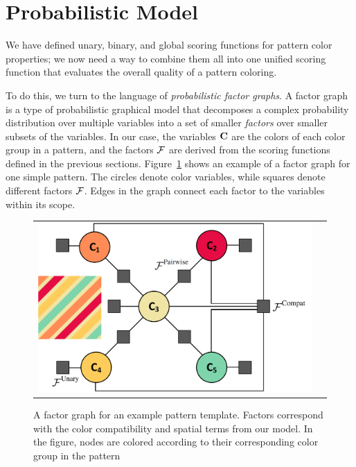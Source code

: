 \section{Probabilistic Model}
\label{sec:model}

We have defined unary, binary, and global scoring functions for pattern color properties; we now need a way to combine them all into one unified scoring function that evaluates the overall quality of a pattern coloring.

To do this, we turn to the language of \emph{probabilistic factor graphs}. A factor graph is a type of probabilistic graphical model that decomposes a complex probability distribution over multiple variables into a set of smaller \emph{factors} over smaller subsets of the variables. In our case, the variables $\mathbf{C}$ are the colors of each color group in a pattern, and the factors $\mathcal{F}$ are derived from the scoring functions defined in the previous sections. Figure~\ref{fig:FactorGraph} shows an example of a factor graph for one simple pattern. The circles denote color variables, while squares denote different factors $\mathcal{F}$. Edges in the graph connect each factor to the variables within its scope.

\begin{figure}[ht]
\begin{tabular}{cc}
\includegraphics{figs/factorGraphNew}
\\
\end{tabular} 
\caption{A factor graph for an example pattern template. Factors correspond with the color compatibility and spatial terms from our model. In the figure, nodes are colored according to their corresponding color group in the pattern}
\label{fig:FactorGraph}
\end{figure}

